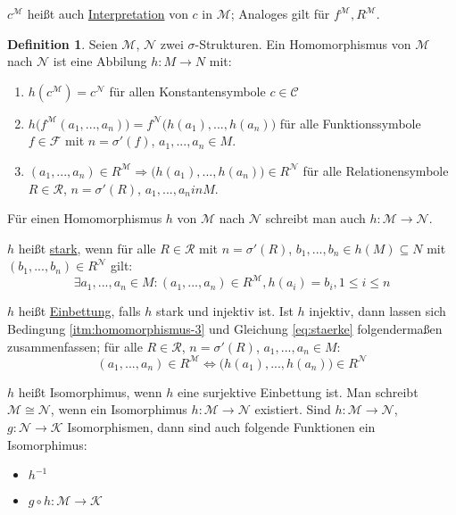 \documentclass{article}
\theoremstyle{definition}
\newtheorem{dfn}{Definition}[section]
\theoremstyle{plain}
\newcommand{\calC}{\mathcal{C}}
\newcommand{\calF}{\mathcal{F}}
\newcommand{\calK}{\mathcal{K}}
\newcommand{\calM}{\mathcal{M}}
\newcommand{\calN}{\mathcal{N}}
\newcommand{\calR}{\mathcal{R}}
\begin{document}
    $ c^\calM $ heißt auch \underline{Interpretation} von $ c $ in $ \calM $; Analoges gilt für $ f^\calM, R^\calM $.

    \begin{dfn}
        Seien $ \calM $, $ \calN $ zwei $ \sigma $-Strukturen.
        Ein Homomorphismus von $ \calM $ nach $ \calN $ ist eine Abbilung $ h : M \rightarrow N $ mit:
        \begin{enumerate}
            \item $ h(c^\calM) = c^\calN $ für allen Konstantensymbole $ c \in \calC $
            \item $ h\big(f^\calM(a_1, ..., a_n)\big) = f^\calN\big(h(a_1), ..., h(a_n)\big) $ für alle Funktionssymbole $ f \in \calF $ mit $ n = \sigma'(f) $, $ a_1, ..., a_n \in M $.
            \item \label{itm:homomorphismus-3} $ (a_1, ..., a_n) \in R^\calM \Rightarrow \big(h(a_1), ..., h(a_n)) \in R^\calN $ für alle Relationensymbole $ R \in \calR $, $ n = \sigma'(R) $, $ a_1, ..., a_n in M $.
        \end{enumerate}
    \end{dfn}

    Für einen Homomorphismus $ h $ von $ \calM $ nach $ \calN $ schreibt man auch $ h : \calM \rightarrow \calN $.

    $ h $ heißt \underline{stark}, wenn für alle $ R \in \calR $ mit $ n = \sigma'(R) $, $ b_1, ..., b_n \in h(M) \subseteq N $ mit $ (b_1, ..., b_n) \in R^\calN $ gilt:
    \begin{equation}
        \label{eq:staerke}
        \exists a_1, ..., a_n \in M : (a_1, ..., a_n) \in R^\calM, h(a_i) = b_i, 1 \leq i \leq n
    \end{equation}

    $ h $ heißt \underline{Einbettung}, falls $ h $ stark und injektiv ist.
    Ist $ h $ injektiv, dann lassen sich Bedingung \ref{itm:homomorphismus-3} und Gleichung \eqref{eq:staerke} folgendermaßen zusammenfassen; für alle $ R \in \calR $, $ n = \sigma'(R) $, $ a_1, ..., a_n \in M $:
    \begin{equation}
        (a_1, ..., a_n) \in R^\calM \Leftrightarrow \big(h(a_1), ..., h(a_n)\big) \in R^\calN
    \end{equation}

    $ h $ heißt Isomorphimus, wenn $ h $ eine surjektive Einbettung ist.
    Man schreibt $ \calM \cong \calN $, wenn ein Isomorphimus $ h : \calM \rightarrow \calN $ existiert.
    Sind $ h : \calM \rightarrow \calN $, $ g : \calN \rightarrow \calK $ Isomorphismen, dann sind auch folgende Funktionen ein Isomorphimus:
    \begin{itemize}
        \item $ h^{-1} $
        \item $ g \circ h : \calM \rightarrow \calK $
    \end{itemize}
\end{document}
